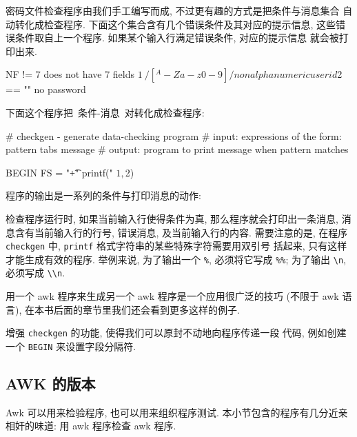 密码文件检查程序由我们手工编写而成, 不过更有趣的方式是把条件与消息集合
自动转化成检查程序. 下面这个集合含有几个错误条件及其对应的提示信息, 
这些错误条件取自上一个程序. 如果某个输入行满足错误条件, 对应的提示信息
就会被打印出来.
\begin{shell}
    NF != 7                 does not have 7 fields
    $1 ~ /[^A-Za-z0-9]/     nonalphanumeric user id
    $2 == ""                no password
\end{shell}
下面这个程序把\ \mbox{条件}\mbox{-}消息\ 对转化成检查程序:
\begin{awkcode}
    # checkgen - generate data-checking program
    #     input:  expressions of the form: pattern tabs message
    #     output: program to print message when pattern matches
    
    BEGIN { FS = "\t+" }
    { printf("%
          $1, $2)
    }
\end{awkcode}
程序的输出是一系列的条件与打印消息的动作:
检查程序运行时, 如果当前输入行使得条件为真, 那么程序就会打印出一条消息, 
消息含有当前输入行的行号, 错误消息, 及当前输入行的内容.
需要注意的是, 在程序
\verb'checkgen' 中, \verb'printf' 格式字符串的某些特殊字符需要用双引号
括起来, 只有这样才能生成有效的程序. 举例来说, 为了输出一个 \verb'%',
必须将它写成 \verb'%%'; 为了输出 \verb'\n', 必须写成 \verb'\\n'.

用一个 awk 程序来生成另一个 awk 程序是一个应用很广泛的技巧 (不限于 awk
语言), 在本书后面的章节里我们还会看到更多这样的例子.

\begin{exercise}
    增强 \verb'checkgen' 的功能, 使得我们可以原封不动地向程序传递一段
    代码, 例如创建一个 \verb'BEGIN' 来设置字段分隔符.
\end{exercise}

\subsection{AWK 的版本}
\label{subsec:which_version_of_awk}

Awk 可以用来检验程序, 也可以用来组织程序测试. 本小节包含的程序有几分近亲
相奸的味道: 用 awk 程序检查 awk 程序.

